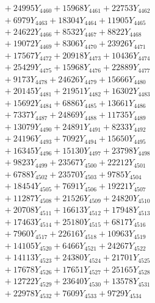 \documentclass[a4paper,10pt]{article}
\begin{document}
{\begin{align}
&\;  + 24995 Y_{4460} + 15968 Y_{4461} + 22753 Y_{4462} \\[0.3ex]
&\;  + 6979 Y_{4463} + 18304 Y_{4464} + 11905 Y_{4465} \\[0.3ex]
&\;  + 24622 Y_{4466} + 8532 Y_{4467} + 8822 Y_{4468} \\[0.5ex]\allowbreak
&\;  + 19072 Y_{4469} + 8306 Y_{4470} + 23926 Y_{4471} \\[0.3ex]
&\;  + 17567 Y_{4472} + 20918 Y_{4473} + 10436 Y_{4474} \\[0.3ex]
&\;  + 25429 Y_{4475} + 15968 Y_{4476} + 22889 Y_{4477} \\[0.3ex]
&\;  + 9173 Y_{4478} + 24626 Y_{4479} + 15666 Y_{4480} \\[0.3ex]
&\;  + 20145 Y_{4481} + 21951 Y_{4482} + 16302 Y_{4483} \\[0.3ex]
&\;  + 15692 Y_{4484} + 6886 Y_{4485} + 13661 Y_{4486} \\[0.3ex]
&\;  + 7337 Y_{4487} + 24869 Y_{4488} + 11735 Y_{4489} \\[0.3ex]
&\;  + 13079 Y_{4490} + 24891 Y_{4491} + 8233 Y_{4492} \\[0.3ex]
&\;  + 24196 Y_{4493} + 7092 Y_{4494} + 15650 Y_{4495} \\[0.3ex]
&\;  + 16345 Y_{4496} + 15130 Y_{4497} + 23798 Y_{4498} \\[0.5ex]\allowbreak
&\;  + 9823 Y_{4499} + 23567 Y_{4500} + 22212 Y_{4501} \\[0.3ex]
&\;  + 6788 Y_{4502} + 23570 Y_{4503} + 9785 Y_{4504} \\[0.3ex]
&\;  + 18454 Y_{4505} + 7691 Y_{4506} + 19221 Y_{4507} \\[0.3ex]
&\;  + 11287 Y_{4508} + 21526 Y_{4509} + 24820 Y_{4510} \\[0.3ex]
&\;  + 20708 Y_{4511} + 16613 Y_{4512} + 17948 Y_{4513} \\[0.3ex]
&\;  + 17463 Y_{4514} + 25180 Y_{4515} + 6817 Y_{4516} \\[0.3ex]
&\;  + 7960 Y_{4517} + 22616 Y_{4518} + 10963 Y_{4519} \\[0.3ex]
&\;  + 14105 Y_{4520} + 6466 Y_{4521} + 24267 Y_{4522} \\[0.3ex]
&\;  + 14113 Y_{4523} + 24380 Y_{4524} + 21701 Y_{4525} \\[0.3ex]
&\;  + 17678 Y_{4526} + 17651 Y_{4527} + 25165 Y_{4528} \\[0.5ex]\allowbreak
&\;  + 12722 Y_{4529} + 23640 Y_{4530} + 13578 Y_{4531} \\[0.3ex]
&\;  + 22978 Y_{4532} + 7609 Y_{4533} + 9729 Y_{4534} \\[0.3ex]

\end{align}}
\end{document}
